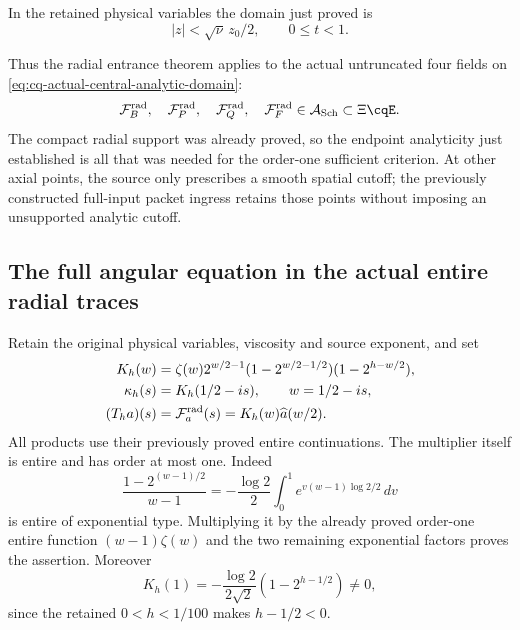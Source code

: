 In the retained physical variables the domain just proved is
\begin{equation}
 |z|<\sqrt\nu\,z_0/2,\qquad 0\leq t<1.
 \label{eq:cq-actual-central-analytic-domain}
\end{equation}

Thus the
radial entrance theorem applies to the actual untruncated
four fields on \eqref{eq:cq-actual-central-analytic-domain}:
\[
 \mathcal F_B^{\rm rad},\quad\mathcal F_P^{\rm rad},\quad
 \mathcal F_Q^{\rm rad},\quad\mathcal F_F^{\rm rad}
           \in\mathcal A_{\rm Sch}\subset\Xi\cqE .
\]
The compact radial support was already proved, so the endpoint
analyticity just established is all that was needed for the
order-one sufficient criterion. At other axial points, the
source only prescribes a smooth spatial cutoff; the previously
constructed full-input packet ingress retains those points
without imposing an unsupported analytic cutoff.

\subsection{The full angular equation in the actual entire radial traces}
\label{sec:cq-radial-entire-dynamics}

Retain the original physical variables, viscosity and source exponent,
and set
\begin{equation}
\begin{split}
 K_h(w)&=\zeta(w)2^{w/2-1}
       (1-2^{w/2-1/2})(1-2^{h-w/2}),\\
 \kappa_h(s)&=K_h(1/2-is),\qquad w=1/2-is,\\
 (T_ha)(s)&=\mathcal F_a^{\rm rad}(s)
                  =K_h(w)\widehat a(w/2).
\end{split}
\label{eq:cq-radial-dynamics-multiplier}
\end{equation}
All products use their previously proved entire continuations.
The multiplier itself is entire and has order at most one. Indeed
\[
 \frac{1-2^{(w-1)/2}}{w-1}
   =-\frac{\log2}{2}\int_0^1
                  e^{v(w-1)\log2/2}\,dv
\]
is entire of exponential type. Multiplying it by the already proved
order-one entire function $(w-1)\zeta(w)$ and the two remaining
exponential factors proves the assertion. Moreover
\[
 K_h(1)=-\frac{\log2}{2\sqrt2}(1-2^{h-1/2})\ne0,
\]
since the retained $0<h<1/100$ makes $h-1/2<0$.

